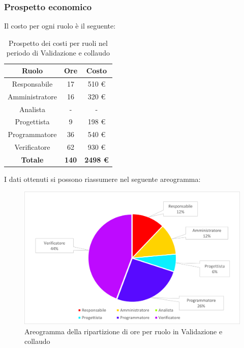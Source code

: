 \subsubsection{Prospetto economico}
Il costo per ogni ruolo è il seguente:
\begin{table}[H]
		\begin{center}
			\setlength{\aboverulesep}{0pt}
			\setlength{\belowrulesep}{0pt}
			\setlength{\extrarowheight}{.75ex}
			\begin{tabular}{ c c c }
				\rowcolor{AzzurroGruppo!30} 
				\textbf{Ruolo} & \textbf{Ore} & \textbf{Costo}  \\
				\toprule
				Responsabile   & 17 & 510 \euro \\
				Amministratore & 16 & 320 \euro \\
				Analista       & -  & - \\
				Progettista    & 9  & 198 \euro \\
				Programmatore  & 36 & 540 \euro \\
				Verificatore   & 62 & 930 \euro \\
				\textbf{Totale} & \textbf{140} & \textbf{2498 \euro} \\
				\bottomrule
			\end{tabular}
			\caption{ Prospetto dei costi per ruoli nel periodo di Validazione e collaudo}
		\end{center}
	\end{table}
I dati ottenuti si possono riassumere nel seguente areogramma:
\begin{figure}[H]
    \centering
    \includegraphics[scale = 0.5]{components/img/Sprint-10-11-torta.png}
    \caption{ Areogramma della ripartizione di ore per ruolo in Validazione e collaudo}
    \label{fig:Areogramma ripartizione ore , fase di Validazione e collaudo}
\end{figure}
